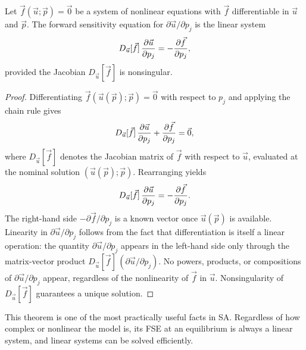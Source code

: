 \begin{theorem}
\label{thm:linearFSE}
Let $\vec{f}(\vec{u}; \vec{p}) = \vec{0}$ be a system of nonlinear equations
with $\vec{f}$ differentiable in $\vec{u}$ and $\vec{p}$.
The forward sensitivity equation for $\partial\vec{u}/\partial p_j$ is
the linear system
\[
  D_{\vec{u}}[\vec{f}]\,\frac{\partial \vec{u}}{\partial p_j} = -\frac{\partial \vec{f}}{\partial p_j},
\]
provided the Jacobian $D_{\vec{u}}[\vec{f}]$ is nonsingular.
\end{theorem}

\begin{proof}
Differentiating $\vec{f}(\vec{u}(\vec{p}); \vec{p}) = \vec{0}$ with
respect to $p_j$ and applying the chain rule gives
\[
  D_{\vec{u}}[\vec{f}]\,\frac{\partial \vec{u}}{\partial p_j} + \frac{\partial \vec{f}}{\partial p_j} = \vec{0},
\]
where $D_{\vec{u}}[\vec{f}]$ denotes the Jacobian matrix of $\vec{f}$
with respect to $\vec{u}$, evaluated at the nominal solution
$(\vec{u}(\vec{p}); \vec{p})$. Rearranging yields
\[
  D_{\vec{u}}[\vec{f}]\,\frac{\partial \vec{u}}{\partial p_j} = -\frac{\partial \vec{f}}{\partial p_j}.
\]
The right-hand side $-\partial\vec{f}/\partial p_j$ is a known vector
once $\vec{u}(\vec{p})$ is available.
Linearity in $\partial\vec{u}/\partial p_j$ follows from the fact that
differentiation is itself a linear operation: the quantity
$\partial\vec{u}/\partial p_j$ appears in the left-hand side
only through the matrix-vector product $D_{\vec{u}}[\vec{f}]\,(\partial\vec{u}/\partial p_j)$.
No powers, products, or compositions of $\partial\vec{u}/\partial p_j$ appear,
regardless of the nonlinearity of $\vec{f}$ in $\vec{u}$.
Nonsingularity of $D_{\vec{u}}[\vec{f}]$ guarantees a unique solution.
\end{proof}

This theorem is one of the most practically useful facts in SA.
Regardless of how complex or nonlinear the model is, its FSE at
an equilibrium is always a linear system, and linear systems
can be solved efficiently.

